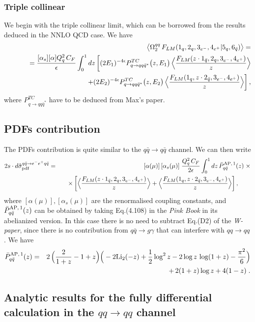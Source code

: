 \documentclass[12pt,a4paper]{article}
\newcommand{\nn}{\nonumber}
\newcommand{\eps}{\epsilon}
\newcommand{\beq}{\begin{eqnarray}}
\newcommand{\eeq}{\end{eqnarray}}
\newcommand{\barq}{{\bar{q}}}
\begin{document}
\subsubsection{Triple collinear}
We begin with the triple collinear limit, which can be borrowed from 
the results deduced in the NNLO QCD case. We have
\beq
 && \hspace{-7mm}
 \big\langle 
 \Omega^{qq}_2
\, F_{LM}(1_q,2_q,3_{e^-},4_{e^+} | 5_q, 6_{\bar{q}})
\big\rangle =
\nn \\
&&
=
\frac{ [\alpha_s] [\alpha] Q_q^2 \, C_F}{\eps} 
\int_0^1 dz \, 
\bigg[
 (2 E_1)^{-4\eps} 
P_{q\rightarrow qq \barq^*}^{TC}\big(z,E_1\big) \,
\Big\langle
\frac{F_{LM}(z\cdot1_\barq,2_q,3_{e^-},4_{e^+})}{z}
\Big\rangle
 \nn \\
 && \hspace{40mm}
+
 (2 E_2)^{-4\eps} 
P_{q\rightarrow qq \barq^*}^{TC}\big(z,E_2\big) \, 
\Big\langle
\frac{F_{LM}(1_q,z\cdot2_\barq,3_{e^-},4_{e^+} )}{z}
\Big\rangle
\bigg]
\, ,
\eeq
where $P_{q\rightarrow qq \barq^*}^{TC}$ have to be deduced from Max's paper.

\subsection{PDFs contribution}
The PDFs contribution is quite similar to the $q\barq \rightarrow q\barq$ channel.
We can then write
\beq
2s \cdot d\hat{\sigma}^{q\barq \rightarrow e^-e^+q\barq}_{\rm pdf}
&=&
 [\alpha(\mu)] \, 
[\alpha_s(\mu)] \;
 \frac{Q_q^2\, C_F}{2 \eps}
\int_0^1 dz \, \bar{P}_{q\barq}^{\rm AP, \, 1}(z) \; \times
\nn \\
&& \quad \times \, 
\bigg[
\Big\langle
\frac{F_{LM}(z\cdot1_\barq,2_q,3_{e^-},4_{e^+})}{z}
\Big\rangle
+
\Big\langle
\frac{F_{LM}(1_q,z\cdot2_\barq,3_{e^-},4_{e^+} )}{z}
\Big\rangle
\bigg]
 \, ,
 \qquad
\eeq
where $ [\alpha(\mu)],
[\alpha_s(\mu)]$ are the renormalised coupling constants, and
$\bar{P}_{q\barq}^{\rm AP, \, 1}(z)$ can be obtained by taking
Eq.(4.108) in the {\it Pink Book} in its abelianized
version. In this case there is no need to subtract 
Eq.(D2) of the {\it W-paper}, since there is no
contribution from $q\barq \rightarrow g\gamma$
that can interfere with $qq \rightarrow qq$. We have
\beq
\bar{P}_{q\barq}^{\rm AP, \, 1}(z)
&=&
2 \, \Big( \frac{2}{1+z}
- 1
+z
\Big)
\Big(
-2 {\rm Li}_2(-z)
+\frac12 \log^2 z
- 2 \log z \, \log (1+z)
- \frac{\pi^2}{6} 
\Big)
\nn \\
&&
+ \, 2 (1+z) \log z
+ 4 (1-z)
 \; .
\eeq

\subsection{Analytic results for the fully differential calculation in the 
$q q \rightarrow q q$ channel}
\end{document}
